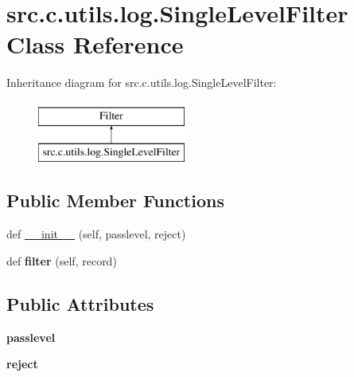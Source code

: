 \hypertarget{classsrc_1_1c_1_1utils_1_1log_1_1_single_level_filter}{}\section{src.\+c.\+utils.\+log.\+Single\+Level\+Filter Class Reference}
\label{classsrc_1_1c_1_1utils_1_1log_1_1_single_level_filter}
Inheritance diagram for src.\+c.\+utils.\+log.\+Single\+Level\+Filter\+:\begin{figure}[H]
\begin{center}
\leavevmode
\includegraphics[height=2.000000cm]{classsrc_1_1c_1_1utils_1_1log_1_1_single_level_filter}
\end{center}
\end{figure}
\subsection*{Public Member Functions}
\begin{DoxyCompactItemize}
\item 
def \hyperlink{classsrc_1_1c_1_1utils_1_1log_1_1_single_level_filter_a4b1517954d18a6551dcdb782bd83a2a0}{\+\_\+\+\_\+init\+\_\+\+\_\+} (self, passlevel, reject)
\item 
\hypertarget{classsrc_1_1c_1_1utils_1_1log_1_1_single_level_filter_a2d4d201822bdddcb91921b3e34d75cb6}{}def {\bfseries filter} (self, record)\label{classsrc_1_1c_1_1utils_1_1log_1_1_single_level_filter_a2d4d201822bdddcb91921b3e34d75cb6}

\end{DoxyCompactItemize}
\subsection*{Public Attributes}
\begin{DoxyCompactItemize}
\item 
\hypertarget{classsrc_1_1c_1_1utils_1_1log_1_1_single_level_filter_a4b54e7cfb00f734c6690646ea6d442f3}{}{\bfseries passlevel}\label{classsrc_1_1c_1_1utils_1_1log_1_1_single_level_filter_a4b54e7cfb00f734c6690646ea6d442f3}

\item 
\hypertarget{classsrc_1_1c_1_1utils_1_1log_1_1_single_level_filter_a2cbe952a527230e2ba8cd667bc420cba}{}{\bfseries reject}\label{classsrc_1_1c_1_1utils_1_1log_1_1_single_level_filter_a2cbe952a527230e2ba8cd667bc420cba}

\end{DoxyCompactItemize}


